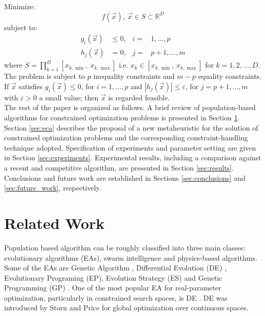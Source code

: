 \documentclass[conference]{IEEEtran}
\begin{document}
\noindent
Minimize:
\begin{equation}
	f(\vec{x}),\ \vec{x}  \in S \subset \mathbb{R}^D
	\label{eqn:fx}
\end{equation}
%
subject to:
\begin{align*}
	g_i(\vec{x}) &\leq 0,& i =&  1 , \ldots, p \\
	h_j(\vec{x}) &= 0,& j =& p+1, \ldots, m
\end{align*}
%
where $S = \prod_{k = 1}^D  [ x_{k,\min},\ x_{k,\max} ]$ i.e. $x_k \in [ x_{k,\min},\ x_{k,\max} ]$ 
for $k = 1,2,\ldots,D$. The problem is subject to $p$ inequality constraints and 
$m - p$ equality constraints. If $\vec{x}$ satisfies $g_i( \vec{x} ) \leq 0$, for 
$i = 1, \ldots, p$ and $|h_j(\vec{x})| \leq \varepsilon$, for $j = p+1, \ldots, m$ 
with $\varepsilon > 0$ a small value; then $\vec{x}$ is regarded feasible.\\


The rest of the paper is organized as follows. A brief review of population-based 
algorithms for constrained optimization problems is presented in Section \ref{sec:related_work}. 
Section \ref{sec:eca} describes the proposal of a new metaheuristic for the solution 
of constrained optimization problems and the corresponding constraint-handling 
technique adopted. Specification of experiments and parameter setting are given 
in Section \ref{sec:experiments}. Experimental results, including a comparison 
against a recent and competitive algorithm, are presented in Section \ref{sec:results}. 
Conclusions and future work are established in Sections \ref{sec:conclusions} and 
\ref{sec:future_work}, respectively.


\section{Related Work} %
\label{sec:related_work}

Population based algorithm can be roughly classified into three main classes:
evolutionary algorithms (EAs), swarm intelligence and physics-based algorithms.
Some of the EAs are Genetic Algorithm \cite{melanie96}, Differential Evolution (DE) 
\cite{ed1995}, Evolutionary Programing (EP), Evolution Strategy (ES) and Genetic 
Programming (GP) \cite{back,spall03}.
%
One of the most popular EA for real-parameter optimization, particularly in constrained 
search spaces, is DE \cite{Mezura10}. DE was introduced by Storn and Price \cite{ed1995}  
for global optimization over continuous spaces.\\
%
\end{document}
